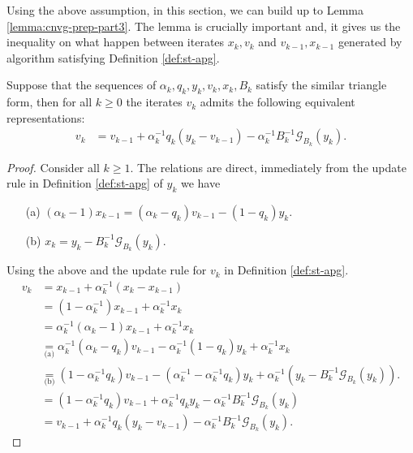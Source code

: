 \documentclass[12pt]{article}
\begin{document}
    Using the above assumption, in this section, we can build up to Lemma \ref{lemma:cnvg-prep-part3}. 
    The lemma is crucially important and, it gives us the inequality on what happen between iterates $x_{k}, v_{k}$ and $v_{k - 1}, x_{k - 1}$ generated by algorithm satisfying Definition \ref{def:st-apg}. 
    \begin{lemma}\label{lemma:st-iterates-alt-form-part1}
        Suppose that the sequences of $\alpha_k, q_k, y_k, v_k, x_k, B_k$ satisfy the similar triangle form, then for all $k \ge 0$ the iterates $v_k$ admits the following equivalent representations: 
        \begin{align*}
            v_k
            &= v_{k - 1} + \alpha_k^{-1}q_k(y_k - v_{k - 1}) - \alpha_{k}^{-1}B_k^{-1}\mathcal G_{B_k}(y_k). 
        \end{align*}
    \end{lemma}
    \begin{proof}
        Consider all $k \ge 1$. 
        The relations are direct, immediately from the update rule in Definition \ref{def:st-apg} of $y_k$ we have
        \begin{enumerate}[nosep]
            \item[(a)] $(\alpha_k - 1)x_{k - 1} = (\alpha_k - q_k)v_{k - 1} - (1 - q_k)y_k$. 
            \item[(b)] $x_k = y_k - B_k^{-1}\mathcal G_{B_k}(y_k)$. 
        \end{enumerate}
        Using the above and the update rule for $v_k$ in Definition \ref{def:st-apg}. 
        \begin{align*}
            v_k &= x_{k - 1} + \alpha_k^{-1}(x_k - x_{k - 1})
            \\
            &= (1 - \alpha_k^{-1})x_{k - 1} + \alpha_k^{-1}x_k
            \\
            &= \alpha_k^{-1}(\alpha_k - 1)x_{k - 1} + \alpha_k^{-1}x_k
            \\
            &\underset{\text{(a)}}{=} \alpha_k^{-1}(\alpha_k - q_k)v_{k - 1} - \alpha_{k}^{-1}(1 - q_k)y_k 
            + \alpha_k^{-1}x_k
            \\
            &\underset{\text{(b)}}{=} (1 - \alpha_k^{-1}q_k) v_{k - 1} - (\alpha_k^{-1} - \alpha_k^{-1}q_k)y_k
            + \alpha_k^{-1}(y_k - B_k^{-1}\mathcal G_{B_k}(y_k)). 
            \\
            &= 
            (1 - \alpha_k^{-1}q_k) v_{k - 1} + \alpha_k^{-1}q_ky_k
            - \alpha_k^{-1}B_k^{-1}\mathcal G_{B_k}(y_k)
            \\
            &= v_{k - 1} + \alpha_k^{-1}q_k(y_k - v_{k - 1}) - \alpha_{k}^{-1}B_k^{-1}\mathcal G_{B_k}(y_k). 
        \end{align*}
    \end{proof}
\end{document}
